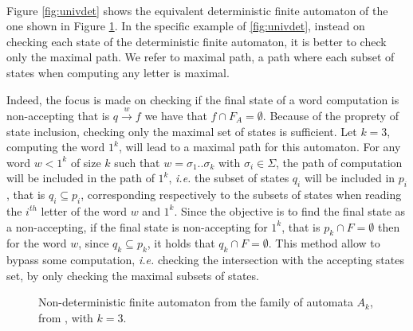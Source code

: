 \documentclass[11pt,a4paper]{article}
\theoremstyle{definition}
\begin{document}
\paragraph{}

Figure \ref{fig:univdet} shows the equivalent deterministic finite
automaton of the one
shown in Figure \ref{fig:univnondet}.
In the specific example of \ref{fig:univdet}, instead on checking
each state of the deterministic finite automaton, it is
better to check only the maximal path.
We refer to maximal path, a path where each subset of states
when computing any letter is maximal.


Indeed, the focus
is made on checking if the final state of a word computation is
non-accepting that is $q \xrightarrow{w} f$ we have that
 $f \cap F_A = \emptyset$.
Because of the
proprety of state inclusion, checking only the
maximal set of states is sufficient. Let $k=3$, computing the word $1^k$,
will lead to a maximal path for this automaton.
For any word $w < 1^k$
of size $k$ such that $w = \sigma_1..\sigma_k$ with $\sigma_i \in \Sigma$,
the path of computation will be included in the path of $1^k$,
\textit{i.e.} the subset of states $q_i$ will be included
in $p_i$, that is $q_i \subseteq p_i$,
corresponding respectively to the subsets of states
when reading the $i^{th}$ letter of the word $w$ and $1^k$.
Since the objective is to find the final state as a non-accepting,
if the final state is non-accepting for $1^k$,
that is $p_k \cap F = \emptyset$ then for the word $w$,
since $q_k \subseteq p_k$, it holds that $q_k \cap F = \emptyset$.
This method allow to bypass some computation, \textit{i.e.}
checking the intersection with the accepting states set, by only checking
the maximal subsets of states.


\begin{figure}
    \center

    \caption{Non-deterministic finite automaton from the
    family of automata $A_k$,
    from \cite{AC_universality}, with $k=3$.}
    \label{fig:univnondet}


\end{figure}
\end{document}
